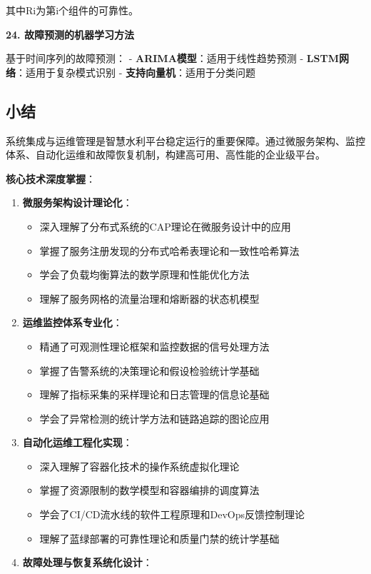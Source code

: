 其中Ri为第i个组件的可靠性。

\textbf{24. 故障预测的机器学习方法}

基于时间序列的故障预测： - \textbf{ARIMA模型}：适用于线性趋势预测 - \textbf{LSTM网络}：适用于复杂模式识别 - \textbf{支持向量机}：适用于分类问题

\subsection{小结}\label{ux5c0fux7ed3}

系统集成与运维管理是智慧水利平台稳定运行的重要保障。通过微服务架构、监控体系、自动化运维和故障恢复机制，构建高可用、高性能的企业级平台。

\textbf{核心技术深度掌握}：

\begin{enumerate}
\def\labelenumi{\arabic{enumi}.}
\tightlist
\item
  \textbf{微服务架构设计理论化}：

  \begin{itemize}
  \tightlist
  \item
    深入理解了分布式系统的CAP理论在微服务设计中的应用
  \item
    掌握了服务注册发现的分布式哈希表理论和一致性哈希算法
  \item
    学会了负载均衡算法的数学原理和性能优化方法
  \item
    理解了服务网格的流量治理和熔断器的状态机模型
  \end{itemize}
\item
  \textbf{运维监控体系专业化}：

  \begin{itemize}
  \tightlist
  \item
    精通了可观测性理论框架和监控数据的信号处理方法
  \item
    掌握了告警系统的决策理论和假设检验统计学基础
  \item
    理解了指标采集的采样理论和日志管理的信息论基础
  \item
    学会了异常检测的统计学方法和链路追踪的图论应用
  \end{itemize}
\item
  \textbf{自动化运维工程化实现}：

  \begin{itemize}
  \tightlist
  \item
    深入理解了容器化技术的操作系统虚拟化理论
  \item
    掌握了资源限制的数学模型和容器编排的调度算法
  \item
    学会了CI/CD流水线的软件工程原理和DevOps反馈控制理论
  \item
    理解了蓝绿部署的可靠性理论和质量门禁的统计学基础
  \end{itemize}
\item
  \textbf{故障处理与恢复系统化设计}：


\end{enumerate}
